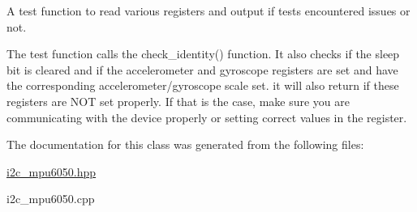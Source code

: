 A test function to read various registers and output if tests encountered issues or not. 

The test function calls the check\+\_\+identity() function. It also checks if the sleep bit is cleared and if the accelerometer and gyroscope registers are set and have the corresponding accelerometer/gyroscope scale set. it will also return if these registers are N\+OT set properly. If that is the case, make sure you are communicating with the device properly or setting correct values in the register. 

The documentation for this class was generated from the following files\+:\begin{DoxyCompactItemize}
\item 
\mbox{\hyperlink{i2c__mpu6050_8hpp}{i2c\+\_\+mpu6050.\+hpp}}\item 
i2c\+\_\+mpu6050.\+cpp\end{DoxyCompactItemize}
